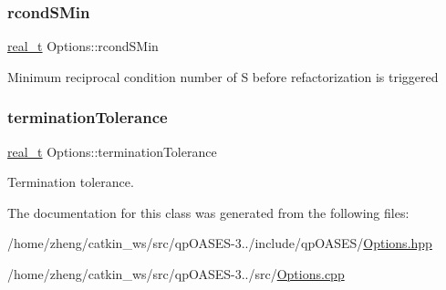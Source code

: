 \subsubsection{\texorpdfstring{rcond\+S\+Min}{rcondSMin}}
{\footnotesize\ttfamily \hyperlink{qp_o_a_s_e_s__wrapper_8h_a0d00e2b3dfadee81331bbb39068570c4}{real\+\_\+t} Options\+::rcond\+S\+Min}

Minimum reciprocal condition number of S before refactorization is triggered \mbox{\label{class_options_ad18a17e6fd0c84625ad44261a7f73474}} 
\subsubsection{\texorpdfstring{termination\+Tolerance}{terminationTolerance}}
{\footnotesize\ttfamily \hyperlink{qp_o_a_s_e_s__wrapper_8h_a0d00e2b3dfadee81331bbb39068570c4}{real\+\_\+t} Options\+::termination\+Tolerance}

Termination tolerance. 

The documentation for this class was generated from the following files\+:\begin{DoxyCompactItemize}
\item 
/home/zheng/catkin\+\_\+ws/src/qp\+O\+A\+S\+E\+S-\/3../include/qp\+O\+A\+S\+E\+S/\hyperlink{_options_8hpp}{Options.\+hpp}\item 
/home/zheng/catkin\+\_\+ws/src/qp\+O\+A\+S\+E\+S-\/3../src/\hyperlink{_options_8cpp}{Options.\+cpp}\end{DoxyCompactItemize}
